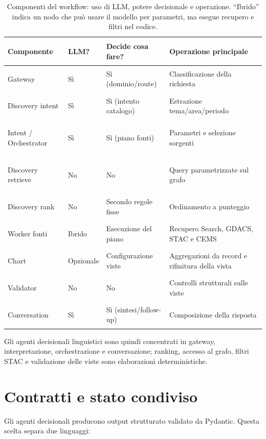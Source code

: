\begin{table}[htbp]
\centering
\small
\begin{tabularx}{\textwidth}{
    >{\bfseries\raggedright\arraybackslash}p{}
    >{\centering\arraybackslash}p{}
    >{\raggedright\arraybackslash}p{}
    >{\raggedright\arraybackslash}X}
\toprule
Componente & LLM? & Decide cosa fare? & Operazione principale \\
\midrule
Gateway & Sì & Sì (dominio/route) & Classificazione della richiesta \\
\addlinespace[1pt]
Discovery intent & Sì & Sì (intento catalogo) & Estrazione tema/area/periodo \\
\addlinespace[1pt]
Intent / Orchestrator & Sì & Sì (piano fonti) & Parametri e selezione sorgenti \\
\addlinespace[1pt]
Discovery retrieve & No & No & Query parametrizzate sul grafo \\
\addlinespace[1pt]
Discovery rank & No & Secondo regole fisse & Ordinamento a punteggio \\
\addlinespace[1pt]
Worker fonti & Ibrido & Esecuzione del piano & Recupero Search, GDACS, STAC e CEMS \\
\addlinespace[1pt]
Chart & Opzionale & Configurazione viste & Aggregazioni da record e rifinitura della vista \\
\addlinespace[1pt]
Validator & No & No & Controlli strutturali sulle viste \\
\addlinespace[1pt]
Conversation & Sì & Sì (sintesi/follow-up) & Composizione della risposta \\
\bottomrule
\end{tabularx}
\caption{Componenti del workflow: uso di LLM, potere decisionale e operazione.
``Ibrido'' indica un nodo che può usare il modello per parametri, ma esegue
recupero e filtri nel codice.}
\label{tab:agenti-llm}
\end{table}

Gli agenti decisionali linguistici sono quindi concentrati in gateway,
interpretazione, orchestrazione e conversazione; ranking, accesso al grafo,
filtri STAC e validazione delle viste sono elaborazioni deterministiche.

\section{Contratti e stato condiviso}

Gli agenti decisionali producono output strutturato validato da Pydantic.
Questa scelta separa due linguaggi:

